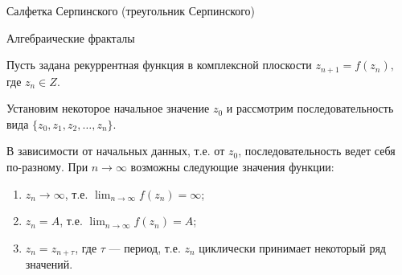 \documentclass{beamer}
\begin{document}
\begin{frame}{Салфетка Серпинского (треугольник Серпинского)}
	\end{frame}

	\begin{frame}{Алгебраические фракталы}

		Пусть задана рекуррентная функция в комплексной плоскости
		$z_{n+1} = f(z_n),$ где $z_n \in Z$.
		
		Установим некоторое начальное значение $z_0$ и рассмотрим последовательность вида $\{z_0, z_1, z_2, \dots , z_n \}$.

		В зависимости от начальных данных, т.е. от $z_0$, последовательность ведет себя по-разному. При $n \to \infty$ возможны следующие значения функции:
		\begin{enumerate}
			\item $z_n \to \infty$, т.е. $\lim_{n \to \infty} f(z_n) = \infty$;
			\item $z_n = A$, т.е. $\lim_{n \to \infty} f(z_n) = A$;
			\item $z_n = z_{n+ \tau}$, где  $\tau$ --- период, т.е. $z_n$ циклически принимает некоторый ряд значений.
		\end{enumerate}

	\end{frame}
\end{document}
